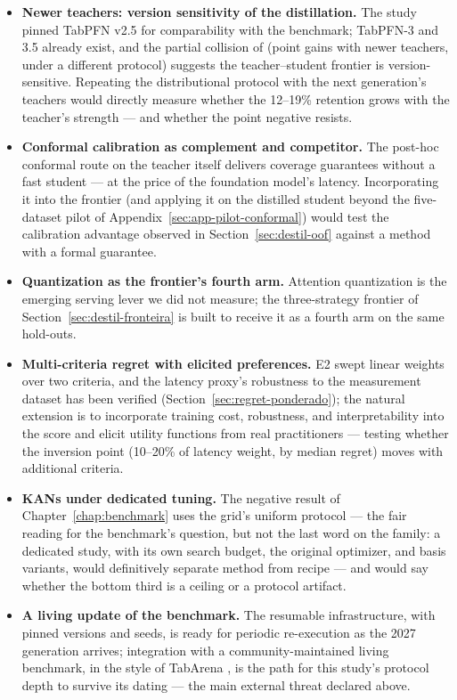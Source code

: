 \begin{itemize}
  \item \textbf{Newer teachers: version sensitivity of the
    distillation.} The study pinned TabPFN v2.5 for comparability
    with the benchmark; TabPFN-3 and 3.5
    \citep{tabpfn3-2026,tabpfn35tr2026} already exist, and the
    partial collision of \citet{jeong2026} (point gains with newer
    teachers, under a different protocol) suggests the
    teacher--student frontier is version-sensitive. Repeating the
    distributional protocol with the next generation's teachers
    would directly measure whether the 12--19\% retention grows
    with the teacher's strength --- and whether the point negative
    resists.
  \item \textbf{Conformal calibration as complement and
    competitor.} The post-hoc conformal route on the teacher
    itself \citep{park2026} delivers coverage guarantees without a
    fast student --- at the price of the foundation model's
    latency. Incorporating it into the frontier (and applying it on
    the distilled student beyond the five-dataset pilot of
    Appendix~\ref{sec:app-pilot-conformal}) would test the
    calibration advantage observed in
    Section~\ref{sec:destil-oof} against a method with a formal
    guarantee.
  \item \textbf{Quantization as the frontier's fourth arm.}
    Attention quantization \citep{kubler2026} is the emerging
    serving lever we did not measure; the three-strategy frontier
    of Section~\ref{sec:destil-fronteira} is built to receive it
    as a fourth arm on the same hold-outs.
  \item \textbf{Multi-criteria regret with elicited preferences.}
    E2 swept linear weights over two criteria, and the latency
    proxy's robustness to the measurement dataset has been
    verified (Section~\ref{sec:regret-ponderado}); the natural
    extension is to incorporate training cost, robustness, and
    interpretability into the score and elicit utility functions
    from real practitioners --- testing whether the inversion
    point (10--20\% of latency weight, by median regret) moves with
    additional criteria.
  \item \textbf{KANs under dedicated tuning.} The negative result
    of Chapter~\ref{chap:benchmark} uses the grid's uniform
    protocol --- the fair reading for the benchmark's question,
    but not the last word on the family: a dedicated study, with
    its own search budget, the original optimizer, and basis
    variants, would definitively separate method from recipe ---
    and would say whether the bottom third is a ceiling or a
    protocol artifact.
  \item \textbf{A living update of the benchmark.} The resumable
    infrastructure, with pinned versions and seeds, is ready for
    periodic re-execution as the 2027 generation arrives;
    integration with a community-maintained living benchmark, in
    the style of TabArena \citep{tabarena2025}, is the path for
    this study's protocol depth to survive its dating --- the main
    external threat declared above.
\end{itemize}


